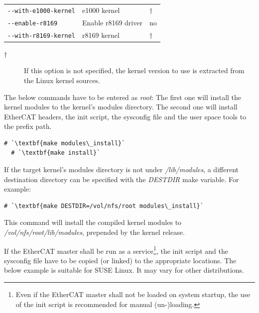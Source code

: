 \documentclass[a4paper,12pt,BCOR6mm,bibtotoc,idxtotoc]{scrbook}
\begin{document}
\begin{table}
\begin{tabular}{l|p{}|l}
\lstinline+--with-e1000-kernel+ & e1000 kernel & $\dagger$\\

\lstinline+--enable-r8169+ & Enable r8169 driver & no\\

\lstinline+--with-r8169-kernel+ & r8169 kernel & $\dagger$\\

  \end{tabular}
  \vspace{2mm}

\begin{description}

\item[$\dagger$] If this option is not specified, the kernel version to use is
extracted from the Linux kernel sources.

\end{description}

\end{table}

The below commands have to be entered as \textit{root}: The first one
will install the kernel modules to the kernel's modules directory. The
second one will install EtherCAT headers, the init script, the
sysconfig file and the user space tools to the prefix path.

\begin{lstlisting}[gobble=2]
  # `\textbf{make modules\_install}`
  # `\textbf{make install}`
\end{lstlisting}

If the target kernel's modules directory is not under
\textit{/lib/modules}, a different destination directory can be
specified with the \textit{DESTDIR} make variable. For example:

\begin{lstlisting}[gobble=2]
  # `\textbf{make DESTDIR=/vol/nfs/root modules\_install}`
\end{lstlisting}

This command will install the compiled kernel modules to
\textit{/vol/nfs/root/lib/modules}, prepended by the kernel release.

If the EtherCAT master shall be run as a service\footnote{Even if the EtherCAT
master shall not be loaded on system startup, the use of the init script is
recommended for manual (un-)loading.}, the init script and the sysconfig file
have to be copied (or linked) to the appropriate locations. The below example
is suitable for SUSE Linux. It may vary for other distributions.
\end{document}
